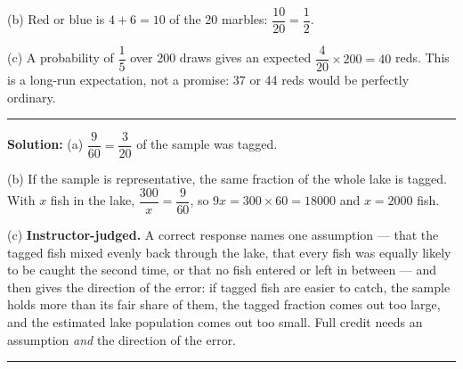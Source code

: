 \documentclass[12pt]{article}
\begin{document}
(b) Red or blue is $4 + 6 = 10$ of the 20 marbles:
$\dfrac{10}{20} = \dfrac{1}{2}$. 

(c) A probability of $\dfrac{1}{5}$ over 200 draws gives an expected
$\dfrac{4}{20} \times 200 = 40$ reds. This is a long-run expectation, not a
promise: 37 or 44 reds would be perfectly ordinary. 

\vspace{0.25cm}\noindent\rule{\linewidth}{0.2pt}\vspace{0.25cm}


\textbf{Solution:} (a) $\dfrac{9}{60} = \dfrac{3}{20}$ of the sample was
tagged. 

(b) If the sample is representative, the same fraction of the whole lake is
tagged. With $x$ fish in the lake,
$\dfrac{300}{x} = \dfrac{9}{60}$, so $9x = 300 \times 60 = 18000$ and
$x = 2000$ fish. 

(c) \textbf{Instructor-judged.} A correct response names one assumption --- that
the tagged fish mixed evenly back through the lake, that every fish was equally
likely to be caught the second time, or that no fish entered or left in between
--- and then gives the direction of the error: if tagged fish are easier to
catch, the sample holds more than its fair share of them, the tagged fraction
comes out too large, and the estimated lake population comes out too small. Full
credit needs an assumption \emph{and} the direction of the error.

\vspace{0.25cm}\noindent\rule{\linewidth}{0.2pt}\vspace{0.25cm}
\end{document}
